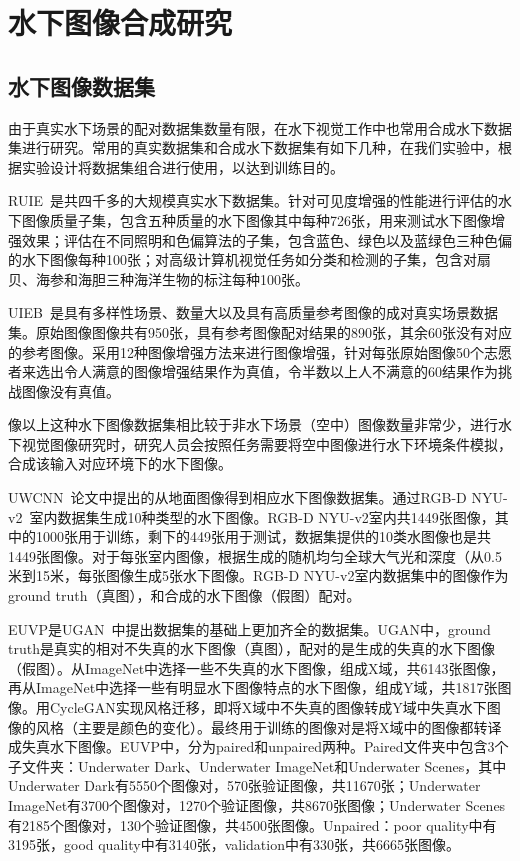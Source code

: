 \section{水下图像合成研究}
\subsection{水下图像数据集}
由于真实水下场景的配对数据集数量有限，在水下视觉工作中也常用合成水下数据集进行研究。常用的真实数据集和合成水下数据集有如下几种，在我们实验中，根据实验设计将数据集组合进行使用，以达到训练目的。

RUIE~\cite{liu2019real}是共四千多的大规模真实水下数据集。针对可见度增强的性能进行评估的水下图像质量子集，包含五种质量的水下图像其中每种726张，用来测试水下图像增强效果；评估在不同照明和色偏算法的子集，包含蓝色、绿色以及蓝绿色三种色偏的水下图像每种100张；对高级计算机视觉任务如分类和检测的子集，包含对扇贝、海参和海胆三种海洋生物的标注每种100张。

UIEB~\cite{li2019underwater}是具有多样性场景、数量大以及具有高质量参考图像的成对真实场景数据集。原始图像图像共有950张，具有参考图像配对结果的890张，其余60张没有对应的参考图像。采用12种图像增强方法来进行图像增强，针对每张原始图像50个志愿者来选出令人满意的图像增强结果作为真值，令半数以上人不满意的60结果作为挑战图像没有真值。

像以上这种水下图像数据集相比较于非水下场景（空中）图像数量非常少，进行水下视觉图像研究时，研究人员会按照任务需要将空中图像进行水下环境条件模拟，合成该输入对应环境下的水下图像。

UWCNN~\cite{li2020underwater}论文中提出的从地面图像得到相应水下图像数据集。通过RGB-D NYU-v2~\cite{Silberman:ECCV12}室内数据集生成10种类型的水下图像。RGB-D NYU-v2室内共1449张图像，其中的1000张用于训练，剩下的449张用于测试，数据集提供的10类水图像也是共1449张图像。对于每张室内图像，根据生成的随机均匀全球大气光和深度（从0.5米到15米，每张图像生成5张水下图像。RGB-D NYU-v2室内数据集中的图像作为ground truth（真图），和合成的水下图像（假图）配对。

EUVP是UGAN~\cite{fabbri2018enhancing}中提出数据集的基础上更加齐全的数据集。UGAN中，ground truth是真实的相对不失真的水下图像（真图），配对的是生成的失真的水下图像（假图）。从ImageNet中选择一些不失真的水下图像，组成X域，共6143张图像，再从ImageNet中选择一些有明显水下图像特点的水下图像，组成Y域，共1817张图像。用CycleGAN实现风格迁移，即将X域中不失真的图像转成Y域中失真水下图像的风格（主要是颜色的变化）。最终用于训练的图像对是将X域中的图像都转译成失真水下图像。EUVP中，分为paired和unpaired两种。Paired文件夹中包含3个子文件夹：Underwater Dark、Underwater ImageNet和Underwater Scenes，其中Underwater Dark有5550个图像对，570张验证图像，共11670张；Underwater ImageNet有3700个图像对，1270个验证图像，共8670张图像；Underwater Scenes有2185个图像对，130个验证图像，共4500张图像。Unpaired：poor quality中有3195张，good quality中有3140张，validation中有330张，共6665张图像。

